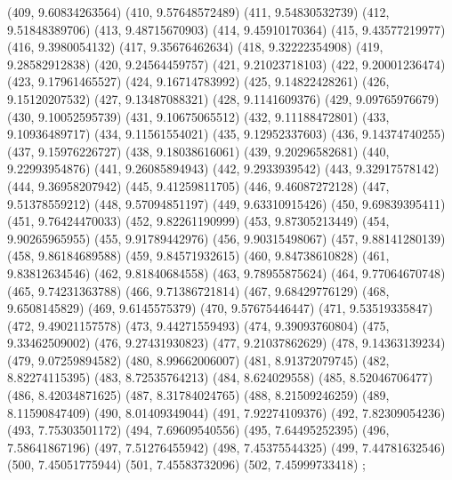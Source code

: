 {					(409, 9.60834263564)
					(410, 9.57648572489)
					(411, 9.54830532739)
					(412, 9.51848389706)
					(413, 9.48715670903)
					(414, 9.45910170364)
					(415, 9.43577219977)
					(416, 9.3980054132)
					(417, 9.35676462634)
					(418, 9.32222354908)
					(419, 9.28582912838)
					(420, 9.24564459757)
					(421, 9.21023718103)
					(422, 9.20001236474)
					(423, 9.17961465527)
					(424, 9.16714783992)
					(425, 9.14822428261)
					(426, 9.15120207532)
					(427, 9.13487088321)
					(428, 9.1141609376)
					(429, 9.09765976679)
					(430, 9.10052595739)
					(431, 9.10675065512)
					(432, 9.11188472801)
					(433, 9.10936489717)
					(434, 9.11561554021)
					(435, 9.12952337603)
					(436, 9.14374740255)
					(437, 9.15976226727)
					(438, 9.18038616061)
					(439, 9.20296582681)
					(440, 9.22993954876)
					(441, 9.26085894943)
					(442, 9.2933939542)
					(443, 9.32917578142)
					(444, 9.36958207942)
					(445, 9.41259811705)
					(446, 9.46087272128)
					(447, 9.51378559212)
					(448, 9.57094851197)
					(449, 9.63310915426)
					(450, 9.69839395411)
					(451, 9.76424470033)
					(452, 9.82261190999)
					(453, 9.87305213449)
					(454, 9.90265965955)
					(455, 9.91789442976)
					(456, 9.90315498067)
					(457, 9.88141280139)
					(458, 9.86184689588)
					(459, 9.84571932615)
					(460, 9.84738610828)
					(461, 9.83812634546)
					(462, 9.81840684558)
					(463, 9.78955875624)
					(464, 9.77064670748)
					(465, 9.74231363788)
					(466, 9.71386721814)
					(467, 9.68429776129)
					(468, 9.6508145829)
					(469, 9.6145575379)
					(470, 9.57675446447)
					(471, 9.53519335847)
					(472, 9.49021157578)
					(473, 9.44271559493)
					(474, 9.39093760804)
					(475, 9.33462509002)
					(476, 9.27431930823)
					(477, 9.21037862629)
					(478, 9.14363139234)
					(479, 9.07259894582)
					(480, 8.99662006007)
					(481, 8.91372079745)
					(482, 8.82274115395)
					(483, 8.72535764213)
					(484, 8.624029558)
					(485, 8.52046706477)
					(486, 8.42034871625)
					(487, 8.31784024765)
					(488, 8.21509246259)
					(489, 8.11590847409)
					(490, 8.01409349044)
					(491, 7.92274109376)
					(492, 7.82309054236)
					(493, 7.75303501172)
					(494, 7.69609540556)
					(495, 7.64495252395)
					(496, 7.58641867196)
					(497, 7.51276455942)
					(498, 7.45375544325)
					(499, 7.44781632546)
					(500, 7.45051775944)
					(501, 7.45583732096)
					(502, 7.45999733418)
				};
